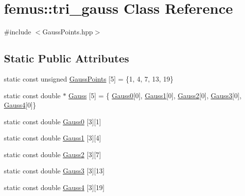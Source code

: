 \hypertarget{classfemus_1_1tri__gauss}{}\section{femus\+:\+:tri\+\_\+gauss Class Reference}
\label{classfemus_1_1tri__gauss}


{\ttfamily \#include $<$Gauss\+Points.\+hpp$>$}

\subsection*{Static Public Attributes}
\begin{DoxyCompactItemize}
\item 
static const unsigned \mbox{\hyperlink{classfemus_1_1tri__gauss_a40b8259641438684fa4a76b912fcb2e1}{Gauss\+Points}} \mbox{[}5\mbox{]} = \{1, 4, 7, 13, 19\}
\item 
static const double $\ast$ \mbox{\hyperlink{classfemus_1_1tri__gauss_aebd5ddfd7b54fdb31369a177fb497443}{Gauss}} \mbox{[}5\mbox{]} = \{ \mbox{\hyperlink{classfemus_1_1tri__gauss_acfc6fe119f422f6029799e9cca8d18af}{Gauss0}}\mbox{[}0\mbox{]}, \mbox{\hyperlink{classfemus_1_1tri__gauss_adad211d24c85b9bb89f94a9ce18a6b59}{Gauss1}}\mbox{[}0\mbox{]}, \mbox{\hyperlink{classfemus_1_1tri__gauss_abe733df39c92f92d3ae8f77dccd315ce}{Gauss2}}\mbox{[}0\mbox{]}, \mbox{\hyperlink{classfemus_1_1tri__gauss_a32b1a6dbc2e4f4d27f8939250b5611b6}{Gauss3}}\mbox{[}0\mbox{]}, \mbox{\hyperlink{classfemus_1_1tri__gauss_a9a95b70f7608299b2787acb925250ae0}{Gauss4}}\mbox{[}0\mbox{]}\}
\item 
static const double \mbox{\hyperlink{classfemus_1_1tri__gauss_acfc6fe119f422f6029799e9cca8d18af}{Gauss0}} \mbox{[}3\mbox{]}\mbox{[}1\mbox{]}
\item 
static const double \mbox{\hyperlink{classfemus_1_1tri__gauss_adad211d24c85b9bb89f94a9ce18a6b59}{Gauss1}} \mbox{[}3\mbox{]}\mbox{[}4\mbox{]}
\item 
static const double \mbox{\hyperlink{classfemus_1_1tri__gauss_abe733df39c92f92d3ae8f77dccd315ce}{Gauss2}} \mbox{[}3\mbox{]}\mbox{[}7\mbox{]}
\item 
static const double \mbox{\hyperlink{classfemus_1_1tri__gauss_a32b1a6dbc2e4f4d27f8939250b5611b6}{Gauss3}} \mbox{[}3\mbox{]}\mbox{[}13\mbox{]}
\item 
static const double \mbox{\hyperlink{classfemus_1_1tri__gauss_a9a95b70f7608299b2787acb925250ae0}{Gauss4}} \mbox{[}3\mbox{]}\mbox{[}19\mbox{]}
\end{DoxyCompactItemize}


